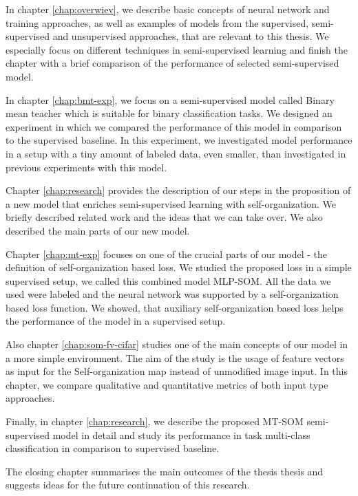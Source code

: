In chapter \ref{chap:overwiev}, we describe basic concepts of neural network and training approaches, as well as examples of models from the supervised, semi-supervised and unsupervised approaches, that are relevant to this thesis. We especially focus on different techniques in semi-supervised learning and finish the chapter with a brief comparison of the performance of selected semi-supervised model. 

In chapter \ref{chap:bmt-exp}, we focus on a semi-supervised model called Binary mean teacher which is suitable for binary classification tasks. We designed an experiment in which we compared the performance of this model in comparison to the supervised baseline. In this experiment, we investigated model performance in a setup with a tiny amount of labeled data, even smaller, than investigated in previous experiments with this model.

Chapter \ref{chap:research} provides the description of our steps in the proposition of a new model that enriches semi-supervised learning with self-organization. We briefly described related work and the ideas that we can take over. We also described the main parts of our new model.

Chapter \ref{chap:mt-exp} focuses on one of the crucial parts of our model - the definition of self-organization based loss. We studied the proposed loss in a simple supervised setup, we called this combined model MLP-SOM. All the data we used were labeled and the neural network was supported by a self-organization based loss function. We showed, that auxiliary self-organization based loss helps the performance of the model in a supervised setup.

Also chapter \ref{chap:som-fv-cifar} studies one of the main concepts of our model in a more simple environment. The aim of the study is the usage of feature vectors as input for the Self-organization map instead of unmodified image input. In this chapter, we compare qualitative and quantitative metrics of both input type approaches.

Finally, in chapter \ref{chap:research}, we describe the proposed MT-SOM semi-supervised model in detail and study its performance in task multi-class classification in comparison to supervised baseline.

The closing chapter summarises the main outcomes of the thesis thesis and suggests ideas for the future continuation of this research.
